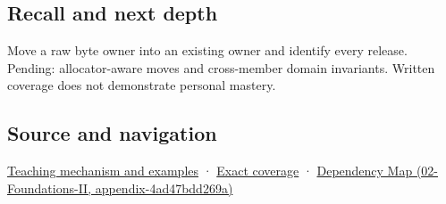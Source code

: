 \subsection{Recall and next depth}\label{appendix-5636651017c2-recall-and-next-depth}

Move a raw byte owner into an existing owner and identify every release. Pending: allocator-aware moves and cross-member domain invariants. Written coverage does not demonstrate personal mastery.

\subsection{Source and navigation}\label{appendix-5636651017c2-source-and-navigation}

\hyperref[01-foundations-i-ch003-a-move-transfers-responsibility-while-the-source-survives]{Teaching mechanism and examples} · \hyperref[appendix-fd090d982a15-m009---parts-127-147]{Exact coverage} · \href{../02-Foundations-II/main.pdf\#nameddest=appendix-4ad47bdd269a}{Dependency Map (02-Foundations-II, appendix-4ad47bdd269a)}
